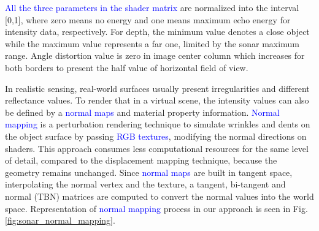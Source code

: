 \documentclass[final,5p,times]{elsarticle}
\begin{document}
\textcolor{blue}{All the three parameters in the shader matrix} are normalized into the interval [0,1], where zero means no energy and one means maximum echo energy for intensity data, respectively. For depth, the minimum value denotes
a close object while the maximum value represents a far one, limited by the sonar maximum range. Angle distortion value is zero in image center column which increases for both borders to present the half value of horizontal field of view.

In realistic sensing, real-world surfaces usually present irregularities
and different reflectance values. To render that in a virtual scene, the
intensity values can also be defined by a \textcolor{blue}{normal maps} and material property information. \textcolor{blue}{Normal mapping} is a perturbation rendering technique to simulate wrinkles and dents on the object surface by passing \textcolor{blue}{RGB textures}, modifying
the normal directions on shaders. This approach consumes less computational
resources for the same level of detail, compared to the displacement mapping
technique, because the geometry remains unchanged. Since \textcolor{blue}{normal maps} are built in tangent space, interpolating the normal vertex and the texture, a tangent, bi-tangent and normal (TBN) matrices are computed to convert the normal values into the world space. Representation of \textcolor{blue}{normal mapping} process in our approach is seen in Fig. \ref{fig:sonar_normal_mapping}.
\end{document}
